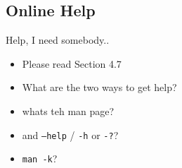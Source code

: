 \documentclass[hyperref={pdfpagelabels=false}]{beamer}
\newcommand{\code}[1]{\colorbox{lGray}{\texttt{#1}}}
\begin{document}
    \subsection{Online Help}
    	\begin{frame}{Help, I need somebody..}
			\begin{itemize}
				\item<1-> Please read Section 4.7
                \item<2-> What are the two ways to get help?
                \item<3-> whats teh man page?
                \item<4-> and \code{--help} / \code{-h} or \code{-?}?
                \item<5-> \code{man -k}?
            \end{itemize}
		\end{frame}
\end{document}
